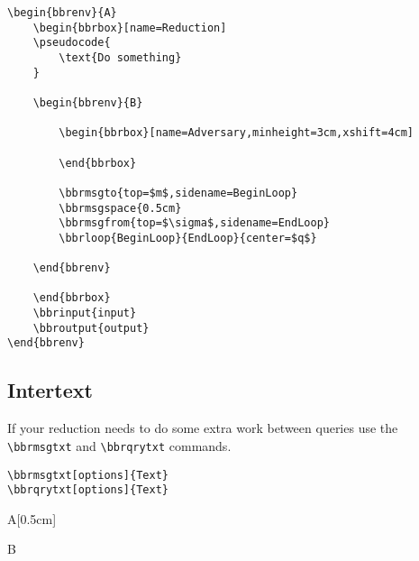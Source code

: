 \documentclass[a4paper]{report}
\begin{document}
\begin{lstlisting}
\begin{bbrenv}{A}
	\begin{bbrbox}[name=Reduction]
	\pseudocode{
		\text{Do something} 
	}

	\begin{bbrenv}{B}

		\begin{bbrbox}[name=Adversary,minheight=3cm,xshift=4cm]

		\end{bbrbox}
		
		\bbrmsgto{top=$m$,sidename=BeginLoop}
		\bbrmsgspace{0.5cm}
		\bbrmsgfrom{top=$\sigma$,sidename=EndLoop}
		\bbrloop{BeginLoop}{EndLoop}{center=$q$}

	\end{bbrenv}

	\end{bbrbox}
	\bbrinput{input}
	\bbroutput{output}
\end{bbrenv}
\end{lstlisting}

\subsection{Intertext}

If your reduction needs to do some extra work between queries use the \lstinline$\bbrmsgtxt$
and \lstinline$\bbrqrytxt$ commands.
\begin{lstlisting}
\bbrmsgtxt[options]{Text}
\bbrqrytxt[options]{Text}
\end{lstlisting}

\begin{bbrenv}[1cm]{A}[0.5cm]
	\begin{bbrbox}[name=Reduction]

	\begin{bbrenv}{B}

		\begin{bbrbox}[name=Adversary,minheight=3cm,xshift=4cm]

		\end{bbrbox}
		


	\end{bbrenv}

	\end{bbrbox}
\end{bbrenv}
\end{document}
